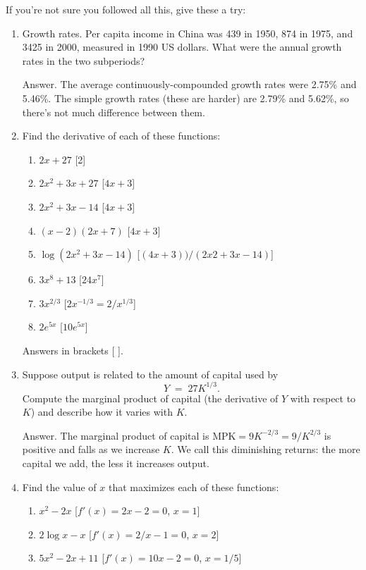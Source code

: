 \documentclass[letterpaper,12pt]{article}
\begin{document}
If you're not sure you followed all this, give these a try:
%
\begin{enumerate}

\item Growth rates.
Per capita income in China was 439 in 1950, 874 in 1975, and 3425 in 2000,
measured in 1990 US dollars.
What were the annual growth rates in the two subperiods?

Answer.
The average continuously-compounded growth rates were 2.75\% and
5.46\%.
The simple growth rates (these are harder) are
2.79\% and 5.62\%, so there's not much difference between them.



\item Find the derivative of each of these functions:
%
\begin{enumerate}
\item $2x + 27$  [2]
\item $2x^2 + 3x  +27$  [$4x+3$]
\item $2x^2 + 3x - 14$  [$4x+3$]
\item $(x-2)(2x+7)$  [$4x+3$]
\item $\log(2x^2 + 3x - 14)$  [$(4x+3))/(2x2+3x-14)$]
\item $3x^8 + 13$  [$24x^7$]
\item $3x^{2/3}$ [$2 x^{-1/3} = 2 / x^{1/3}$]
\item $2 e^{5x}$ [$10 e^{5x}$]
\end{enumerate}

Answers in brackets [ ].

\item Suppose output is related to the amount of capital used by
\[
    Y \;=\; 27 K^{1/3} .
\]
Compute the marginal product of capital (the derivative of $Y$ with respect to $K$)
and describe how it varies with $K$.

Answer.  The marginal product of capital is $ \mbox{MPK} = 9 K^{-2/3} = 9
/ K^{2/3} $ is positive and falls as we increase $K$. We call this
diminishing returns:  the more capital we add, the less it
increases output.

\item Find the value of $x$ that maximizes each of these functions:
\begin{enumerate}
\item $x^2 - 2x$  [$f'(x) = 2x-2 = 0$, $x = 1$]
\item $2 \log x - x$ [$f'(x) = 2/x-1 = 0$, $x = 2$]
\item $5x^2 - 2x + 11$  [$f'(x) = 10x-2 = 0$, $x = 1/5$]
\end{enumerate}


\end{enumerate}
\end{document}
